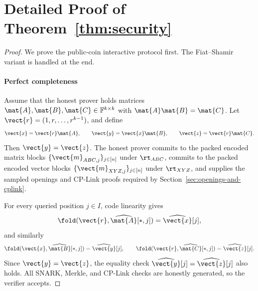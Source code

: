 \section{Detailed Proof of Theorem~\ref{thm:security}}
\label{app:security-proof}

\begin{proof}
We prove the public-coin interactive protocol first.  The Fiat--Shamir variant
is handled at the end.

\paragraph{Perfect completeness}
Assume that the honest prover holds matrices
\(\mat{A},\mat{B},\mat{C}\in\mathbb{F}^{k\times k}\) with
\(\mat{A}\mat{B}=\mat{C}\).  Let
\(\vect{r}=(1,r,\ldots,r^{k-1})\), and define
\[
  \vect{x}=\vect{r}\mat{A},
  \qquad
  \vect{y}=\vect{x}\mat{B},
  \qquad
  \vect{z}=\vect{r}\mat{C}.
\]
Then \(\vect{y}=\vect{z}\).  The honest prover commits to the packed encoded
matrix blocks \(\{\vect{m}_{ABC,j}\}_{j\in[n]}\) under \(\rt_{ABC}\), commits
to the packed encoded vector blocks \(\{\vect{m}_{XYZ,j}\}_{j\in[n]}\) under
\(\rt_{XYZ}\), and supplies the sampled openings and CP-Link proofs required
by Section~\ref{sec:openings-and-cplink}.

For every queried position \(j\in I\), code linearity gives
\[
  \fold(\vect{r},\widehat{\mat{A}}[*,j])
  =
  \widehat{\vect{x}}[j],
\]
and similarly
\[
  \fold(\vect{x},\widehat{\mat{B}}[*,j])
  =
  \widehat{\vect{y}}[j],
  \qquad
  \fold(\vect{r},\widehat{\mat{C}}[*,j])
  =
  \widehat{\vect{z}}[j].
\]
Since \(\vect{y}=\vect{z}\), the equality check
\(\widehat{\vect{y}}[j]=\widehat{\vect{z}}[j]\) also holds.  All SNARK,
Merkle, and CP-Link checks are honestly generated, so the verifier accepts.


\end{proof}
